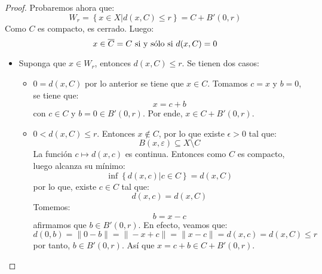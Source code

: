 \documentclass[12pt]{report}
\theoremstyle{largebreak}
\begin{document}
\begin{proof}
        Probaremos ahora que:
        \begin{equation*}
            W_r=\left\{x\in X\Big|d(x,C)\leq r \right\}=C+B'(0,r)
        \end{equation*}
        Como $C$ es compacto, es cerrado. Luego:
        \begin{equation*}
            x\in\overline{C}=C\textup{ si y sólo si }d(x,C)=0
        \end{equation*}
        \begin{itemize}
            \item Suponga que $x\in W_r$, entonces $d(x,C)\leq r$. Se tienen dos casos:
            \begin{itemize}
                \item $0=d(x,C)$ por lo anterior se tiene que $x\in C$. Tomamos $c=x$ y $b=0$, se tiene que:
                \begin{equation*}
                    x=c+b
                \end{equation*}
                con $c\in C$ y $b=0\in B'(0,r)$. Por ende, $x\in C+B'(0,r)$.
                \item $0<d(x,C)\leq r$. Entonces $x\notin C$, por lo que existe $\epsilon>0$ tal que:
                \begin{equation*}
                    B(x,\varepsilon)\subseteq X\setminus C
                \end{equation*}
                La función $c\mapsto d(x,c)$ es continua. Entonces como $C$ es compacto, luego alcanza su mínimo:
                \begin{equation*}
                    \inf\left\{d(x,c)\Big|c\in C \right\}=d(x,C)
                \end{equation*}
                por lo que, existe $c\in C$ tal que:
                \begin{equation*}
                    d(x,c)=d(x,C)
                \end{equation*}
                Tomemos:
                \begin{equation*}
                    b=x-c
                \end{equation*}
                afirmamos que $b\in B'(0,r)$. En efecto, veamos que:
                \begin{equation*}
                    d(0,b)=\|0-b\|=\|-x+c\|=\|x-c\|=d(x,c)=d(x,C)\leq r
                \end{equation*}
                por tanto, $b\in B'(0,r)$. Así que $x=c+b\in C+B'(0,r)$.
            \end{itemize}

\end{itemize}
\end{proof}
\end{document}
